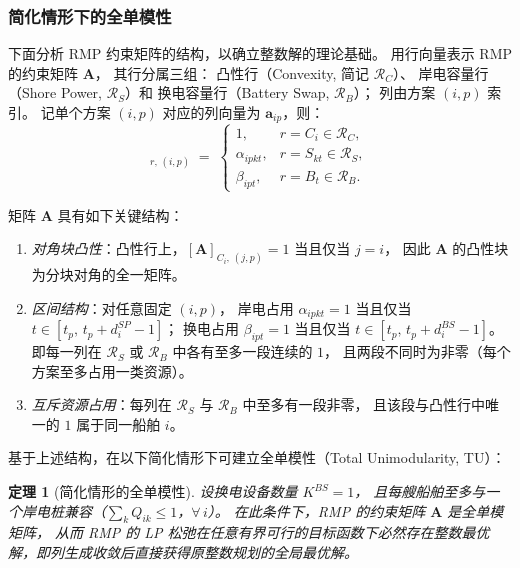 \documentclass[UTF8, a4paper, 12pt]{ctexart}
\newtheorem{theorem}{定理}
\begin{document}
\subsubsection{简化情形下的全单模性}

下面分析 RMP 约束矩阵的结构，以确立整数解的理论基础。
用行向量表示 RMP 的约束矩阵 $\mathbf{A}$，
其行分属三组：
凸性行（Convexity, 简记 $\mathcal{R}_C$）、
岸电容量行（Shore Power, $\mathcal{R}_S$）和
换电容量行（Battery Swap, $\mathcal{R}_B$）；
列由方案 $(i,p)$ 索引。
记单个方案 $(i,p)$ 对应的列向量为 $\mathbf{a}_{ip}$，则：
\begin{equation}
  [\mathbf{A}]_{r,\,(i,p)}
  \;=\;
  \begin{cases}
    1, & r = C_i\in\mathcal{R}_C, \\
    \alpha_{ipkt}, & r = S_{kt}\in\mathcal{R}_S, \\
    \beta_{ipt},   & r = B_{t}\in\mathcal{R}_B.
  \end{cases}
\end{equation}

矩阵 $\mathbf{A}$ 具有如下关键结构：
\begin{enumerate}[label=(\roman*)]
  \item \emph{对角块凸性}：凸性行上，$[\mathbf{A}]_{C_i,\,(j,p)}=1$ 当且仅当 $j=i$，
        因此 $\mathbf{A}$ 的凸性块为分块对角的全一矩阵。
  \item \emph{区间结构}：对任意固定 $(i,p)$，
        岸电占用 $\alpha_{ipkt}=1$ 当且仅当 $t\in[t_p,\,t_p+d_i^{SP}-1]$；
        换电占用 $\beta_{ipt}=1$ 当且仅当 $t\in[t_p,\,t_p+d_i^{BS}-1]$。
        即每一列在 $\mathcal{R}_S$ 或 $\mathcal{R}_B$ 中各有至多一段连续的 $1$，
        且两段不同时为非零（每个方案至多占用一类资源）。
  \item \emph{互斥资源占用}：每列在 $\mathcal{R}_S$ 与 $\mathcal{R}_B$ 中至多有一段非零，
        且该段与凸性行中唯一的 $1$ 属于同一船舶 $i$。
\end{enumerate}

基于上述结构，在以下简化情形下可建立全单模性（Total Unimodularity, TU）：

\begin{theorem}[简化情形的全单模性]
\label{thm:tu}
设换电设备数量 $K^{BS}=1$，
且每艘船舶至多与一个岸电桩兼容（$\sum_{k}Q_{ik}\le 1$，$\forall\,i$）。
在此条件下，RMP 的约束矩阵 $\mathbf{A}$ 是全单模矩阵，
从而 RMP 的 LP 松弛在任意有界可行的目标函数下必然存在整数最优解，即列生成收敛后直接获得原整数规划的全局最优解。
\end{theorem}
\end{document}
